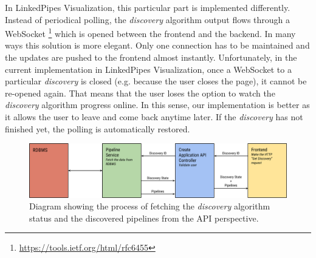 In LinkedPipes Visualization, this particular part is implemented differently. Instead of periodical polling, the \emph{discovery} algorithm output flows through a WebSocket \footnote{\url{https://tools.ietf.org/html/rfc6455}} which is opened between the frontend and the backend. In many ways this solution is more elegant. Only one connection has to be maintained and the updates are pushed to the frontend almost instantly. Unfortunately, in the current implementation in LinkedPipes Visualization, once a WebSocket to a particular \emph{discovery} is closed (e.g. because the user closes the page), it cannot be re-opened again. That means that the user loses the option to watch the \emph{discovery} algorithm progress online. In this sense, our implementation is better as it allows the user to leave and come back anytime later. If the \emph{discovery} has not finished yet, the polling is automatically restored.
\begin{figure}
	\centering
	\includegraphics[width=140mm]{img/04_api_get_discovery_diagram.png}
	\caption{Diagram showing the process of fetching the \emph{discovery} algorithm status and the discovered pipelines from the API perspective.} 
	\label{fig:api-get-discovery-diagram}
\end{figure}





